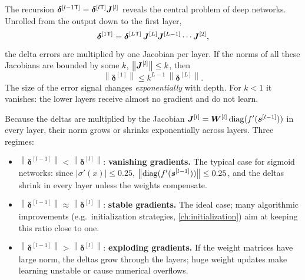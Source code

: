 \documentclass[11pt, oneside]{book}
\newcommand{\norm}[1]{\left\lVert #1 \right\rVert}
\newcommand{\diag}{\operatorname{diag}}
\newcommand{\bdelta}{\bm{\delta}}
\newcommand{\lay}[1]{^{[#1]}}            %
\begin{document}
The recursion $\bdelta\lay{l-1\mathsf{T}} = \bdelta\lay{l\mathsf{T}}\bJ\lay{l}$
reveals the central problem of deep networks. Unrolled from the output down
to the first layer,
\[
  \bdelta\lay{1\mathsf{T}} = \bdelta\lay{L\mathsf{T}}\,\bJ\lay{L}\bJ\lay{L-1}\cdots\bJ\lay{2},
\]
the delta errors are multiplied by one Jacobian per layer. If the norms of
all these Jacobians are bounded by some $k$, $\norm{\bJ\lay{l}} \le k$, then
\[
  \norm{\bdelta\lay{1}} \le k^{L-1}\,\norm{\bdelta\lay{L}} .
\]
The size of the error signal changes \emph{exponentially} with depth. For
$k < 1$ it vanishes: the lower layers receive almost no gradient and do not
learn.

\begin{thmbox}[title={Vanishing and exploding gradients (Hochreiter, 1991)}]
Because the deltas are multiplied by the Jacobian $\bJ\lay{l} =
\bW\lay{l}\diag(f'(\bs\lay{l-1}))$ in every layer, their norm grows or
shrinks exponentially across layers. Three regimes:
\begin{itemize}
  \item $\norm{\bdelta\lay{l-1}} < \norm{\bdelta\lay{l}}$: \textbf{vanishing
    gradients.} The typical case for sigmoid networks: since
    $|\sigma'(x)| \le 0.25$, $\norm{\diag(f'(\bs\lay{l-1}))} \le 0.25$, and
    the deltas shrink in every layer unless the weights compensate.
  \item $\norm{\bdelta\lay{l-1}} \approx \norm{\bdelta\lay{l}}$:
    \textbf{stable gradients.} The ideal case; many algorithmic improvements
    (e.g.\ initialization strategies, \cref{ch:initialization}) aim at
    keeping this ratio close to one.
  \item $\norm{\bdelta\lay{l-1}} > \norm{\bdelta\lay{l}}$: \textbf{exploding
    gradients.} If the weight matrices have large norm, the deltas grow
    through the layers; huge weight updates make learning unstable or cause
    numerical overflows.
\end{itemize}
\end{thmbox}
\end{document}
